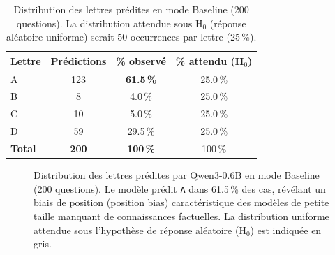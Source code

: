\documentclass[12pt,a4paper]{article}
\begin{document}
\begin{table}[H]
\centering
\caption{Distribution des lettres prédites en mode Baseline (200 questions).
  La distribution attendue sous H$_0$ (réponse aléatoire uniforme) serait
  50 occurrences par lettre (25\,\%).}
\label{tab:distribution_baseline}
\begin{tabular}{@{} l c c c @{}}
\toprule
\textbf{Lettre} & \textbf{Prédictions} & \textbf{\% observé}
  & \textbf{\% attendu (H$_0$)} \\
\midrule
A & 123 & \textbf{61.5\,\%} & 25.0\,\% \\
B & 8   & 4.0\,\%            & 25.0\,\% \\
C & 10  & 5.0\,\%            & 25.0\,\% \\
D & 59  & 29.5\,\%           & 25.0\,\% \\
\midrule
\textbf{Total} & \textbf{200} & \textbf{100\,\%} & 100\,\% \\
\bottomrule
\end{tabular}
\end{table}

\begin{figure}[H]
\centering
{}
\caption{Distribution des lettres prédites par Qwen3-0.6B en mode Baseline
  (200 questions). Le modèle prédit \texttt{A} dans 61.5\,\% des cas, révélant
  un biais de position (position bias) caractéristique des modèles de petite
  taille manquant de connaissances factuelles. La distribution uniforme attendue
  sous l'hypothèse de réponse aléatoire (H$_0$) est indiquée en gris.}
\label{fig:distribution_baseline}
\end{figure}
\end{document}
